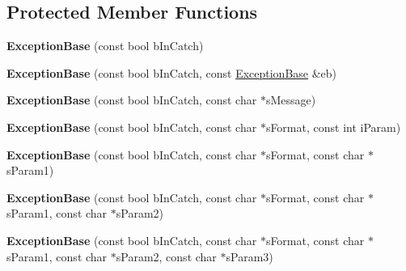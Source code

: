 \subsection*{\-Protected \-Member \-Functions}
\begin{DoxyCompactItemize}
\item 
\hypertarget{classgeneral__server_1_1ExceptionBase_af62bf8eef88a40391318ed12b81640b9}{{\bfseries \-Exception\-Base} (const bool b\-In\-Catch)}\label{classgeneral__server_1_1ExceptionBase_af62bf8eef88a40391318ed12b81640b9}

\item 
\hypertarget{classgeneral__server_1_1ExceptionBase_ac5fab345b4c044530ae2c002395890ca}{{\bfseries \-Exception\-Base} (const bool b\-In\-Catch, const \hyperlink{classgeneral__server_1_1ExceptionBase}{\-Exception\-Base} \&eb)}\label{classgeneral__server_1_1ExceptionBase_ac5fab345b4c044530ae2c002395890ca}

\item 
\hypertarget{classgeneral__server_1_1ExceptionBase_a063ff8ad01e703048aa7e73bc8658958}{{\bfseries \-Exception\-Base} (const bool b\-In\-Catch, const char $\ast$s\-Message)}\label{classgeneral__server_1_1ExceptionBase_a063ff8ad01e703048aa7e73bc8658958}

\item 
\hypertarget{classgeneral__server_1_1ExceptionBase_a7b05d5dc2ca011f3141005c0b1595cd6}{{\bfseries \-Exception\-Base} (const bool b\-In\-Catch, const char $\ast$s\-Format, const int i\-Param)}\label{classgeneral__server_1_1ExceptionBase_a7b05d5dc2ca011f3141005c0b1595cd6}

\item 
\hypertarget{classgeneral__server_1_1ExceptionBase_a45951786aa1e9cb00decebc88d224ca9}{{\bfseries \-Exception\-Base} (const bool b\-In\-Catch, const char $\ast$s\-Format, const char $\ast$s\-Param1)}\label{classgeneral__server_1_1ExceptionBase_a45951786aa1e9cb00decebc88d224ca9}

\item 
\hypertarget{classgeneral__server_1_1ExceptionBase_a1627ba04681d6ec6432fadd61bdcb1b7}{{\bfseries \-Exception\-Base} (const bool b\-In\-Catch, const char $\ast$s\-Format, const char $\ast$s\-Param1, const char $\ast$s\-Param2)}\label{classgeneral__server_1_1ExceptionBase_a1627ba04681d6ec6432fadd61bdcb1b7}

\item 
\hypertarget{classgeneral__server_1_1ExceptionBase_a517116089f88a00751f63b325c352b5d}{{\bfseries \-Exception\-Base} (const bool b\-In\-Catch, const char $\ast$s\-Format, const char $\ast$s\-Param1, const char $\ast$s\-Param2, const char $\ast$s\-Param3)}\label{classgeneral__server_1_1ExceptionBase_a517116089f88a00751f63b325c352b5d}


\end{DoxyCompactItemize}
